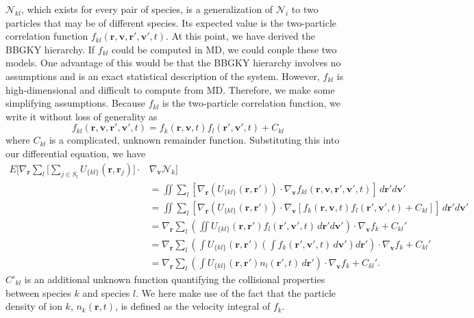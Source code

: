 \documentclass{article}
\begin{document}
$\mathcal{N}_{kl}$, which exists for every pair of species, is a generalization of $\mathcal{N}_i$ to two particles that may be of different species. Its expected value is the two-particle correlation function $f_{kl}(\mathbf{r},\mathbf{v},\mathbf{r}',\mathbf{v}',t)$. At this point, we have derived the BBGKY hierarchy. If $f_{kl}$ could be computed in MD, we could couple these two models. One advantage of this would be that the BBGKY hierarchy involves no assumptions and is an exact statistical description of the system. However, $f_{kl}$ is high-dimensional and difficult to compute from MD. Therefore, we make some simplifying assumptions. Because $f_{kl}$ is the two-particle correlation function, we write it without loss of generality as
\begin{equation}f_{kl}(\mathbf{r},\mathbf{v},\mathbf{r}',\mathbf{v}',t)=f_k(\mathbf{r},\mathbf{v},t)f_l(\mathbf{r}',\mathbf{v}',t)+C_{kl}\label{f2}
\end{equation}
where $C_{kl}$ is a complicated, unknown remainder function. Substituting this into our differential equation, we have
\begin{align*}
E\bigg[\nabla_\mathbf{r}\sum_l\bigg[\sum_{j\in S_l}U_{\{kl\}}(\mathbf{r},\mathbf{r}_j)\bigg]\cdot&\nabla_\mathbf{v}\mathcal{N}_k\bigg]\\&=\iint\sum_l\left[\nabla_\mathbf{r}\left(U_{\{kl\}}(\mathbf{r},\mathbf{r}')\right)\cdot\nabla_\mathbf{v}f_{kl}(\mathbf{r},\mathbf{v},\mathbf{r}',\mathbf{v}',t)\right]\,d\mathbf{r}'d\mathbf{v}'\\
&=\iint\sum_l\left[ \nabla_\mathbf{r}\left(U_{\{kl\}}(\mathbf{r},\mathbf{r}')\right)\cdot\nabla_\mathbf{v}\left[f_{k}(\mathbf{r},\mathbf{v},t)f_l(\mathbf{r}',\mathbf{v}',t)+C_{kl}\right]\right]\,d\mathbf{r}'d\mathbf{v}'
\\
&=\nabla_\mathbf{r}\sum_l\left(\iint U_{\{kl\}}(\mathbf{r},\mathbf{r}')f_l(\mathbf{r}',\mathbf{v}',t)\,d\mathbf{r}'d\mathbf{v}'\right)\cdot\nabla_\mathbf{v}f_k+C_{kl}'\\
&=\nabla_\mathbf{r}\sum_l\left(\int U_{\{kl\}}(\mathbf{r},\mathbf{r}')\left(\int f_k(\mathbf{r}',\mathbf{v}',t)\,d\mathbf{v}'\right)d\mathbf{r}'\right)\cdot\nabla_\mathbf{v} f_k+C_{kl}'\\
&=\nabla_\mathbf{r}\sum_l\left(\int U_{\{kl\}}(\mathbf{r},\mathbf{r}') n_l(\mathbf{r}',t)\,d\mathbf{r}'\right)\cdot\nabla_\mathbf{v} f_k+C_{kl}'.
\end{align*}
$C'_{kl}$ is an additional unknown function quantifying the collisional properties between species $k$ and species $l$. We here make use of the fact that the particle density of ion $k$, $n_k(\mathbf{r},t)$, is defined as the velocity integral of $f_k$.
\end{document}
